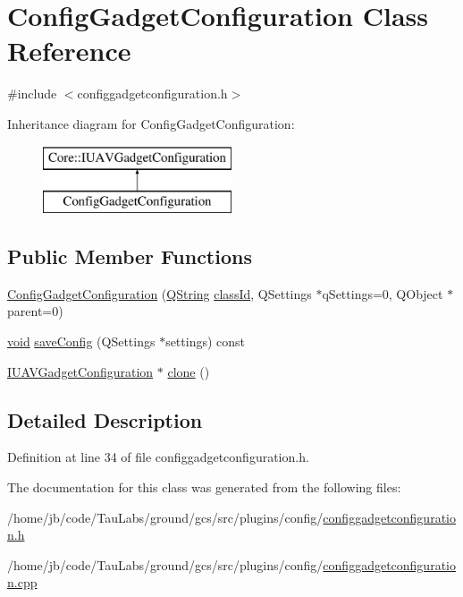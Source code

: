 \hypertarget{class_config_gadget_configuration}{\section{\-Config\-Gadget\-Configuration \-Class \-Reference}
\label{class_config_gadget_configuration}
}


{\ttfamily \#include $<$configgadgetconfiguration.\-h$>$}

\-Inheritance diagram for \-Config\-Gadget\-Configuration\-:\begin{figure}[H]
\begin{center}
\leavevmode
\includegraphics[height=2.000000cm]{class_config_gadget_configuration}
\end{center}
\end{figure}
\subsection*{\-Public \-Member \-Functions}
\begin{DoxyCompactItemize}
\item 
\hyperlink{group___config_plugin_ga60e6c6cfd7819f53b6a76447ba34d774}{\-Config\-Gadget\-Configuration} (\hyperlink{group___u_a_v_objects_plugin_gab9d252f49c333c94a72f97ce3105a32d}{\-Q\-String} \hyperlink{group___core_plugin_gac953657221ba7fda967ada0408332641}{class\-Id}, \-Q\-Settings $\ast$q\-Settings=0, \-Q\-Object $\ast$parent=0)
\item 
\hyperlink{group___u_a_v_objects_plugin_ga444cf2ff3f0ecbe028adce838d373f5c}{void} \hyperlink{group___config_plugin_ga6b1f86f80d200736d29b69452e329040}{save\-Config} (\-Q\-Settings $\ast$settings) const 
\item 
\hyperlink{group___core_plugin_gacdfdf0b1e39b5002472b76b6564ce51f}{\-I\-U\-A\-V\-Gadget\-Configuration} $\ast$ \hyperlink{group___config_plugin_gac237bebed60ca183ae60b2b4598acc47}{clone} ()
\end{DoxyCompactItemize}


\subsection{\-Detailed \-Description}


\-Definition at line 34 of file configgadgetconfiguration.\-h.



\-The documentation for this class was generated from the following files\-:\begin{DoxyCompactItemize}
\item 
/home/jb/code/\-Tau\-Labs/ground/gcs/src/plugins/config/\hyperlink{configgadgetconfiguration_8h}{configgadgetconfiguration.\-h}\item 
/home/jb/code/\-Tau\-Labs/ground/gcs/src/plugins/config/\hyperlink{configgadgetconfiguration_8cpp}{configgadgetconfiguration.\-cpp}\end{DoxyCompactItemize}
